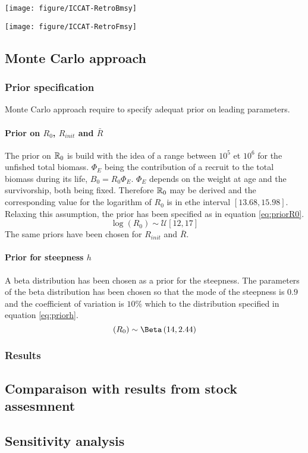 {\centering \texttt{[image: figure/ICCAT-RetroBmsy]} 

}



{\centering \texttt{[image: figure/ICCAT-RetroFmsy]} 

}

\subsection{Monte Carlo approach}
\subsubsection{Prior specification}
Monte Carlo approach require to specify adequat prior on leading parameters.
\paragraph{Prior on $R_0$, $R_{init}$ and $\bar{R}$}
The prior on $\mathbb{R}_0$ is build with the idea of a range between $10^5$ et $10^6$ for the unfished total biomass. $\Phi_E$ being the contribution of a recruit to the total biomass during its life, 
$B_0=R_0\Phi_E$. $\Phi_E$ depends on the weight at age and the survivorship, both being fixed. Therefore $\mathbb{R}_0$ may be derived and the corresponding value for the logarithm of $R_0$ is in ethe interval $[13.68, 15.98]$. Relaxing this assumption, 
the prior has been specified as in equation \ref{eq:priorR0}.
\begin{equation}
\log(R_0) \sim \mathcal{U}[12, 17] 
\label{eq:priorR0}
\end{equation}
The same priors have been chosen for $R_{init}$ and $\bar{R}$. 


\paragraph{Prior for steepness $h$}
A beta distribution has been chosen as a prior for the steepness. The parameters of the beta distribution has been chosen so that the mode of the steepness is $0.9$ and the coefficient of variation is 
$10\%$ which to the distribution specified in equation \ref{eq:priorh}.
\begin{equation}
(R_0) \sim \Beta\left(14, 2.44\right)
\label{eq:priorh}
\end{equation}



\subsubsection{Results}

\subsection{Comparaison with results from stock assesmnent}

\subsection{Sensitivity analysis}
